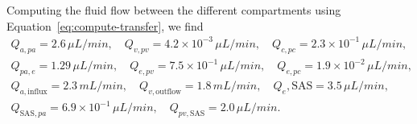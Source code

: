 \documentclass[10pt]{article}
\newcommand{\1}{^{(1)}}
\newcommand{\2}{^{(2)}}
\newcommand{\Cinulin}{$\prescript{14}{}{\text{C}}$-inulin }
\newcommand{\commentout}[1]{}
\providecommand{\DIFaddbegin}{} %
\providecommand{\DIFaddend}{} %
\providecommand{\DIFdelbegin}{} %
\providecommand{\DIFdelend}{} %
\newcommand{\DIFscaledelfig}{0.5}
\newlength{\DIFdelgraphicswidth} %
\newlength{\DIFdelgraphicsheight} %
\newcommand{\DIFaddincludegraphics}[2][]{{\color{blue}\fbox{\DIFOincludegraphics[#1]{#2}}}} %
\newcommand{\DIFdelincludegraphics}[2][]{%
\sbox{\DIFdelgraphicsbox}{\DIFOincludegraphics[#1]{#2}}%
\settoboxwidth{\DIFdelgraphicswidth}{\DIFdelgraphicsbox} %
\settoboxtotalheight{\DIFdelgraphicsheight}{\DIFdelgraphicsbox} %
\scalebox{\DIFscaledelfig}{%
\parbox[b]{\DIFdelgraphicswidth}{\usebox{\DIFdelgraphicsbox}\\[-\baselineskip] \rule{\DIFdelgraphicswidth}{0em}}\llap{\resizebox{\DIFdelgraphicswidth}{\DIFdelgraphicsheight}{%
\setlength{\unitlength}{\DIFdelgraphicswidth}%
\begin{picture}(1,1)%
\thicklines\linethickness{2pt} %
{\color[rgb]{1,0,0}\put(0,0){\framebox(1,1){}}}%
{\color[rgb]{1,0,0}\put(0,0){\line( 1,1){1}}}%
{\color[rgb]{1,0,0}\put(0,1){\line(1,-1){1}}}%
\end{picture}%
}\hspace*{3pt}}} %
} %
\DeclareRobustCommand{\DIFaddbegin}{\DIFOaddbegin \let\includegraphics\DIFaddincludegraphics} %
\DeclareRobustCommand{\DIFaddend}{\DIFOaddend \let\includegraphics\DIFOincludegraphics} %
\DeclareRobustCommand{\DIFdelbegin}{\DIFOdelbegin \let\includegraphics\DIFdelincludegraphics} %
\DeclareRobustCommand{\DIFdelend}{\DIFOaddend \let\includegraphics\DIFOincludegraphics} %
\begin{document}
Computing the fluid flow between the different compartments using Equation~\eqref{eq:compute-transfer}, we find 
\[
\DIFdelbegin %
\DIFdelend \DIFaddbegin \begin{aligned}
    Q_{a,pa} = 2.6 \, \si{\mu L/min},\quad Q_{v,pv} = 4.2 \times 10^{-3} \, \si{\mu L/min},\quad Q_{c,pc} = 2.3\times 10^{-1}  \, \si{\mu L/min}, \\
    Q_{pa,e} = 1.29 \, \si{\mu L/min},\quad Q_{e,pv} = 7.5 \times 10^{-1}  \,\si{\mu L/min},\quad Q_{e,pc} = 1.9 \times 10^{-2} \, \si{\mu L/min}, \\
    Q_{a,\text{influx}} = 2.3 \, \si{mL/min} , \quad Q_{v,\text{outflow}  } = 1.8 \, \si{mL/min},\quad Q_{e},\text{SAS} = 3.5 \, \si{\mu L/min},\\
    Q_{\text{SAS},pa} = 6.9 \times 10^{-1}\,  \si{\mu L/min},\quad Q_{pv,\text{SAS}} = 2.0 \, \si{\mu L/min}.
\end{aligned}\DIFaddend 
\]

\commentout{
\begin{figure}[htbp]
         \centering
        \caption{Comparison of \Cinulin clearance for test case 2 with baseline parameter values and increse of ECS and PVSs porosities with test case 3. "MC Baseline" denotes the  clearance curve given by the multi-compartment model with baseline parameter values. The enhancements of ECS and PVSs porosities lead to the curve denoted "MC enhancement ECS+PVS" and the result of test case 3 is denoted "MC 7 compartements"}
        \label{fig:compare-blood}
\end{figure}
}
\end{document}
